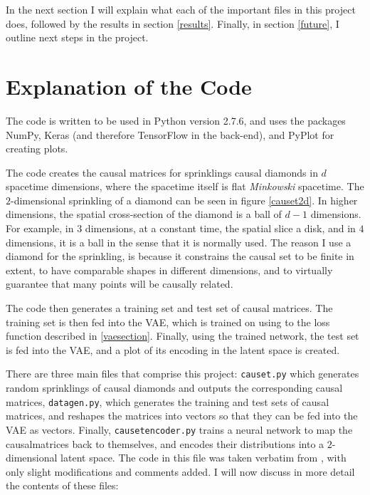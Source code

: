\documentclass[letterpaper,10pt]{article}
\def\code#1{\texttt{#1}}
\begin{document}
In the next section I will explain what each of the important files in this project does, followed by the results in section \ref{results}.  Finally, 
in section \ref{future}, I outline next steps in the project.

\section{Explanation of the Code}

The code is written to be used in Python version 2.7.6, and uses the packages NumPy, Keras (and therefore TensorFlow in the back-end), and PyPlot for 
creating plots.

The code creates the causal matrices for sprinklings causal diamonds in $d$ spacetime dimensions, where the spacetime itself is flat {\it Minkowski} 
spacetime.  The $2$-dimensional sprinkling of a diamond can be seen in figure \ref{causet2d}.  In higher dimensions, the spatial cross-section of the 
diamond is a ball of $d-1$ dimensions.  For example, in $3$ dimensions, at a constant time, the spatial slice a disk, and in $4$ dimensions, it is a 
ball in the sense that it is normally used.  The reason I use a diamond for the sprinkling, is because it constrains the causal set to be finite in extent, 
to have comparable shapes in different dimensions, and to virtually guarantee that many points will be causally related.

The code then generates a training set and test set of causal matrices. The training set is then fed into the VAE, which is trained on  
using to the loss function described in \ref{vaesection}.  Finally, using the trained network, the test set is fed into the VAE, and a plot of its 
encoding in the latent space is created.

There are three main files that comprise this project: \code{causet.py} which generates random sprinklings of causal diamonds and outputs 
the corresponding causal matrices, \code{datagen.py}, which generates the training and test sets of causal matrices, and reshapes the matrices into vectors so that 
they can be fed into the VAE as vectors.  Finally, \code{causetencoder.py} trains a neural network to map the causalmatrices back to themselves, and 
encodes their distributions into a $2$-dimensional latent space.  The code in this file was taken verbatim from 
\cite{kerasauto}, with only slight modifications and comments added.  I will now discuss in more detail the contents of these files:
\end{document}
